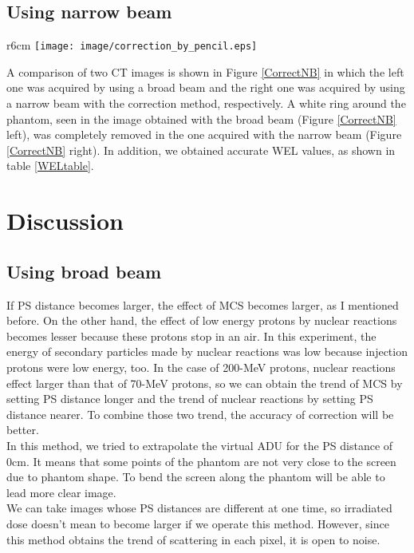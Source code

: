 \documentclass[preprint,3pt]{elsarticle} %
\begin{document}
{\subsection{Using narrow beam}
\begin{wrapfigure}{r}{6cm}%
\vspace*{-\intextsep} %
\texttt{[image: image/correction\_by\_pencil.eps]}
\caption{CT images acquired using broad (left) and narrow (right) beams.}
\label{CorrectNB}
\end{wrapfigure}
	A comparison of two CT images is shown in Figure \ref{CorrectNB} in which the left one was acquired by using a broad beam and the right one was acquired by using a narrow beam with the correction method, respectively. A white ring around the phantom, seen in the image obtained with the broad beam (Figure \ref{CorrectNB} left), was completely removed in the one acquired with the narrow beam (Figure  \ref{CorrectNB} right). In addition, we obtained accurate WEL values, as shown in table \ref{WELtable}.\\
	
\section{Discussion}
\subsection{Using broad beam}
	If PS distance becomes larger, the effect of MCS becomes	larger, as I mentioned before. On the other hand, the effect of low energy protons by nuclear reactions becomes lesser because these protons stop in an air. In this experiment, the energy of secondary particles made by nuclear reactions was low because injection protons were low energy, too. In the case of 200-MeV protons, nuclear reactions effect larger than that of 70-MeV protons, so we can obtain the trend of MCS by setting PS distance longer and the trend of nuclear reactions by setting PS distance nearer. To combine those two trend, the accuracy of correction will be better.\\
	In this method, we tried to extrapolate the virtual ADU for the PS distance of 0cm. It means that some points of the phantom are not very close to the screen due to phantom shape. To bend the screen along the phantom will be able to lead more clear image.\\
	We can take images whose PS distances are different at one time, so irradiated dose doesn't mean to become larger if we operate this method. However, since this method obtains the trend of scattering in each pixel, it is open to noise. \\
}
\end{document}
